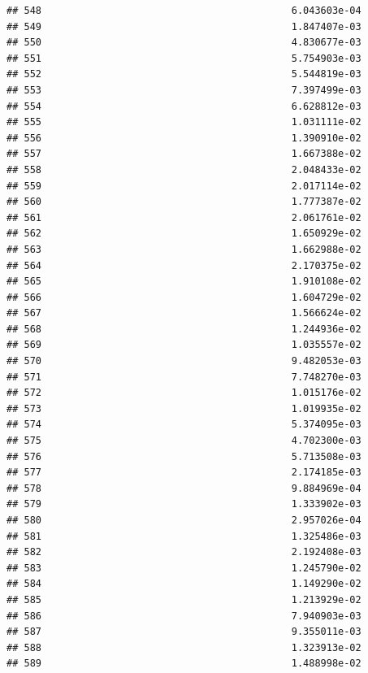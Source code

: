 \documentclass[
]{article}
\begin{document}
\begin{verbatim}
## 548                                           6.043603e-04
## 549                                           1.847407e-03
## 550                                           4.830677e-03
## 551                                           5.754903e-03
## 552                                           5.544819e-03
## 553                                           7.397499e-03
## 554                                           6.628812e-03
## 555                                           1.031111e-02
## 556                                           1.390910e-02
## 557                                           1.667388e-02
## 558                                           2.048433e-02
## 559                                           2.017114e-02
## 560                                           1.777387e-02
## 561                                           2.061761e-02
## 562                                           1.650929e-02
## 563                                           1.662988e-02
## 564                                           2.170375e-02
## 565                                           1.910108e-02
## 566                                           1.604729e-02
## 567                                           1.566624e-02
## 568                                           1.244936e-02
## 569                                           1.035557e-02
## 570                                           9.482053e-03
## 571                                           7.748270e-03
## 572                                           1.015176e-02
## 573                                           1.019935e-02
## 574                                           5.374095e-03
## 575                                           4.702300e-03
## 576                                           5.713508e-03
## 577                                           2.174185e-03
## 578                                           9.884969e-04
## 579                                           1.333902e-03
## 580                                           2.957026e-04
## 581                                           1.325486e-03
## 582                                           2.192408e-03
## 583                                           1.245790e-02
## 584                                           1.149290e-02
## 585                                           1.213929e-02
## 586                                           7.940903e-03
## 587                                           9.355011e-03
## 588                                           1.323913e-02
## 589                                           1.488998e-02

\end{verbatim}
\end{document}
